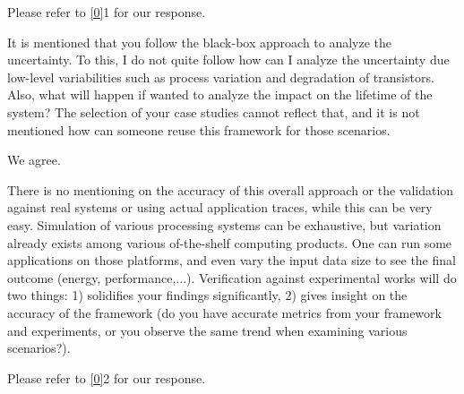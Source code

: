 \begin{authors}
Please refer to \cref{0}{1} for our response.

\begin{actions}
\end{actions}
\end{authors}

\begin{reviewer}
It is mentioned that you follow the black-box approach to analyze the
uncertainty. To this, I do not quite follow how can I analyze the uncertainty
due low-level variabilities such as process variation and degradation of
transistors. Also, what will happen if wanted to analyze the impact on the
lifetime of the system? The selection of your case studies cannot reflect that,
and it is not mentioned how can someone reuse this framework for those
scenarios.
\end{reviewer}

\begin{authors}
We agree.

\begin{actions}
\end{actions}
\end{authors}

\begin{reviewer}
There is no mentioning on the accuracy of this overall approach or the
validation against real systems or using actual application traces, while this
can be very easy. Simulation of various processing systems can be exhaustive,
but variation already exists among various of-the-shelf computing products. One
can run some applications on those platforms, and even vary the input data size
to see the final outcome (energy, performance,...). Verification against
experimental works will do two things: 1) solidifies your findings
significantly, 2) gives insight on the accuracy of the framework (do you have
accurate metrics from your framework and experiments, or you observe the same
trend when examining various scenarios?).
\end{reviewer}

\begin{authors}
Please refer to \cref{0}{2} for our response.

\begin{actions}
\end{actions}
\end{authors}
